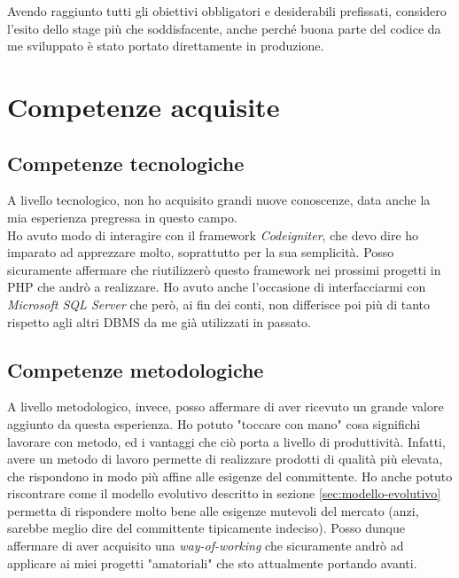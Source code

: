 Avendo raggiunto tutti gli obiettivi obbligatori e desiderabili prefissati, considero l'esito dello stage più che soddisfacente, anche perché buona parte del codice da me sviluppato è stato portato direttamente in produzione.
\section{Competenze acquisite}
\subsection{Competenze tecnologiche}
A livello tecnologico, non ho acquisito grandi nuove conoscenze, data anche la mia esperienza pregressa in questo campo.\\ Ho avuto modo di interagire con il \gls{framework} \textit{Codeigniter}, che devo dire ho imparato ad apprezzare molto, soprattutto per la sua semplicità. Posso sicuramente affermare che riutilizzerò questo \gls{framework} nei prossimi progetti in PHP che andrò a realizzare. Ho avuto anche l'occasione di interfacciarmi con \textit{Microsoft SQL Server} che però, ai fin dei conti, non differisce poi più di tanto rispetto agli altri \gls{DBMS} da me già utilizzati in passato.
\subsection{Competenze metodologiche}
A livello metodologico, invece, posso affermare di aver ricevuto un grande valore aggiunto da questa esperienza. Ho potuto "toccare con mano" cosa significhi lavorare con metodo, ed i vantaggi che ciò porta a livello di produttività. Infatti, avere un metodo di lavoro permette di realizzare prodotti di qualità più elevata, che rispondono in modo più affine alle esigenze del committente. Ho anche potuto riscontrare come il modello evolutivo descritto in sezione \ref{sec:modello-evolutivo} permetta di rispondere molto bene alle esigenze mutevoli del mercato (anzi, sarebbe meglio dire del committente tipicamente indeciso). Posso dunque affermare di aver acquisito una \textit{way-of-working} che sicuramente andrò ad applicare ai miei progetti "amatoriali" che sto attualmente portando avanti.
